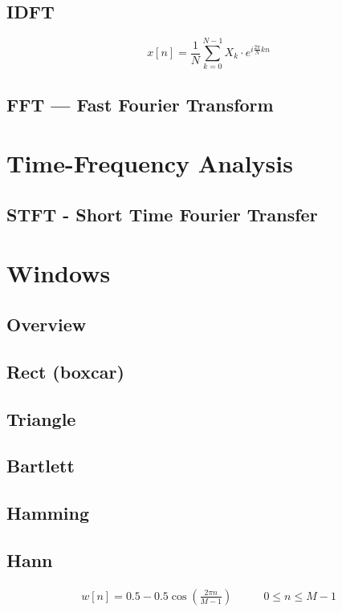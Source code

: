 \subsection{IDFT}
\begin{equation}
    x[n] = \frac{1}{N} \sum_{k=0}^{N-1} X_k\cdot e^{i \frac{2 \pi}{N} k n}
\end{equation}


\subsection{FFT --- Fast Fourier Transform}

\section{Time-Frequency Analysis}
\subsection{STFT - Short Time Fourier Transfer}

\section{Windows}
\subsection{Overview}


\subsection{Rect (boxcar)}
\subsection{Triangle}
\subsection{Bartlett}
\subsection{Hamming}
\subsection{Hann}
\begin{align}
    w[n] = 0.5 - 0.5\cos\left( \frac{ 2\pi n }{ M - 1 } \right) & \qquad 0 \leq n \leq M-1
\end{align}


